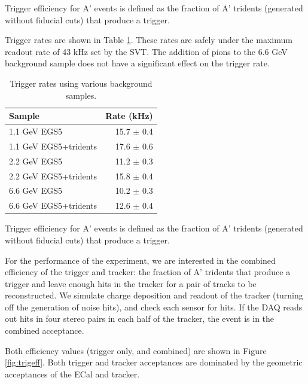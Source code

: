 Trigger efficiency for A' events is defined as the fraction of A' tridents (generated without fiducial cuts) that produce a trigger.

Trigger rates are shown in Table \ref{tab:trigrates}. These rates are safely under the maximum readout rate of 43 kHz set by the SVT. 
The addition of pions to the 6.6 GeV background sample does not have a significant effect on the trigger rate.

\begin{table}
	\begin{tabular}{|l|r|}
		\hline
		Sample &  Rate (kHz)\\
		\hline
		1.1 GeV	EGS5 				& 15.7 $\pm$ 0.4	\\
		1.1 GeV EGS5+tridents			& 17.6 $\pm$ 0.6	\\
		2.2 GeV	EGS5 				& 11.2 $\pm$ 0.3	\\
		2.2 GeV EGS5+tridents			& 15.8 $\pm$ 0.4	\\
		6.6 GeV	EGS5 				& 10.2 $\pm$ 0.3	\\
		6.6 GeV EGS5+tridents			& 12.6 $\pm$ 0.4	\\
		\hline
	\end{tabular}
	\caption{ {\small Trigger rates using various background samples. }
	\label{tab:trigrates}}
\end{table}

Trigger efficiency for A' events is defined as the fraction of A' tridents (generated without fiducial cuts) that produce a trigger.

For the performance of the experiment, we are interested in the combined efficiency of the trigger and tracker: the fraction of A' tridents that produce a trigger and leave enough hits in the tracker for a pair of tracks to be reconstructed.
We simulate charge deposition and readout of the tracker (turning off the generation of noise hits), and check each sensor for hits. 
If the DAQ reads out hits in four stereo pairs in each half of the tracker, the event is in the combined acceptance.

Both efficiency values (trigger only, and combined) are shown in Figure \ref{fig:trigeff}. 
Both trigger and tracker acceptances are dominated by the geometric acceptances of the ECal and tracker.

